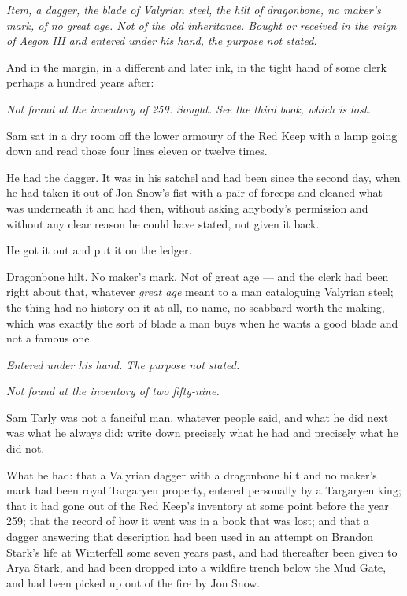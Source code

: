 \textit{Item, a dagger, the blade of Valyrian steel, the hilt of dragonbone, no maker’s mark, of no great age. Not of the old inheritance. Bought or received in the reign of Aegon III and entered under his hand, the purpose not stated.}

And in the margin, in a different and later ink, in the tight hand of some clerk perhaps a hundred years after:

\textit{Not found at the inventory of 259. Sought. See the third book, which is lost.}

\sceneBreak

Sam sat in a dry room off the lower armoury of the Red Keep with a lamp going down and read those four lines eleven or twelve times.

He had the dagger. It was in his satchel and had been since the second day, when he had taken it out of Jon Snow’s fist with a pair of forceps and cleaned what was underneath it and had then, without asking anybody’s permission and without any clear reason he could have stated, not given it back.

He got it out and put it on the ledger.

Dragonbone hilt. No maker’s mark. Not of great age — and the clerk had been right about that, whatever \textit{great age} meant to a man cataloguing Valyrian steel; the thing had no history on it at all, no name, no scabbard worth the making, which was exactly the sort of blade a man buys when he wants a good blade and not a famous one.

\textit{Entered under his hand. The purpose not stated.}

\textit{Not found at the inventory of two fifty-nine.}

Sam Tarly was not a fanciful man, whatever people said, and what he did next was what he always did: write down precisely what he had and precisely what he did not.

What he had: that a Valyrian dagger with a dragonbone hilt and no maker’s mark had been royal Targaryen property, entered personally by a Targaryen king; that it had gone out of the Red Keep’s inventory at some point before the year 259; that the record of how it went was in a book that was lost; and that a dagger answering that description had been used in an attempt on Brandon Stark’s life at Winterfell some seven years past, and had thereafter been given to Arya Stark, and had been dropped into a wildfire trench below the Mud Gate, and had been picked up out of the fire by Jon Snow.

